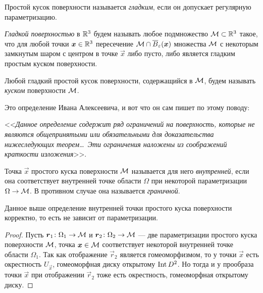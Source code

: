 
\begin{definition}
	Простой кусок поверхности называется \textit{гладким}, если он допускает регулярную параметризацию.

	\textit{Гладкой поверхностью} в $\mathbb{R}^3$ будем называть любое подмножество $\mathcal{M} \subset \mathbb{R}^3$ такое, что для любой точки $\boldsymbol{x} \in \mathbb{R}^3$ пересечение $\mathcal{M} \cap \overline{B}_\varepsilon(\boldsymbol{x})$ множества $\mathcal{M}$ с некоторым замкнутым шаром с центром в точке $\vec{x}$ либо пусто, либо является гладким простым куском поверхности.

	Любой гладкий простой кусок поверхности, содержащийся в $\mathcal{M}$, будем называть \textit{куском} поверхности $\mathcal{M}$.
\end{definition}

Это определение Ивана Алексеевича, и вот что он сам пишет по этому поводу:

\begin{center}
	<<\textit{Данное определение содержит ряд ограничений на поверхность, которые не являются общепринятыми или обязательными для доказательства нижеследующих теорем\ldots\ Эти ограничения наложены из соображений краткости изложения}>>.
\end{center}

\begin{definition}
	Точка $\vec{x}$ простого куска поверхности $\mathcal{M}$ называется для него \textit{внутренней}, если она соответствует внутренней точке области $\Omega$ при некоторой параметризации $\Omega \to \mathcal{M}$. В противном случае она называется \textit{граничной}.
\end{definition}

\begin{proposition}
	Данное выше определение внутренней точки простого куска поверхности корректно, то есть не зависит от параметризации.
\end{proposition}

\begin{proof}
	Пусть $\boldsymbol{r}_1\colon \Omega_1 \to \mathcal{M}$ и $\boldsymbol{r}_2\colon \Omega_2 \to \mathcal{M}$ --- две параметризации простого куска поверхности $\mathcal{M}$, точка $\boldsymbol{x} \in \mathcal{M}$ соответствует некоторой внутренней точке области $\Omega_1$. Так как отображение $\vec{r}_2$ является гомеоморфизмом, то у точки $\vec{x}$ есть окрестность $U_{\vec{x}}$, гомеоморфная диску открытому $\operatorname{Int} D^2$. Но тогда и у прообраза точки $\vec{x}$ при отображении $\vec{r}_2$ тоже есть окрестность, гомеоморфная открытому диску.
\end{proof}

